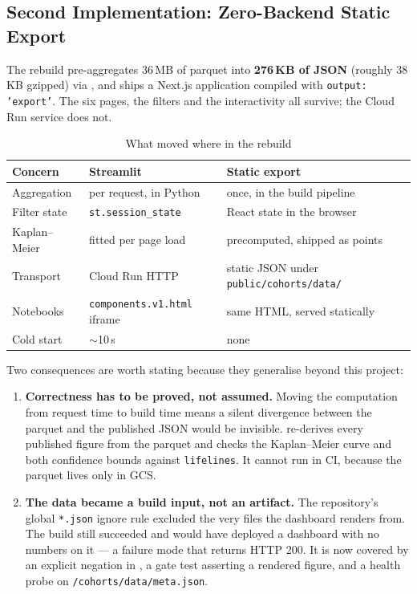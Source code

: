 \subsection{Second Implementation: Zero-Backend Static Export}

The rebuild pre-aggregates 36\,MB of parquet into \textbf{276\,KB of JSON}
(roughly 38\,KB gzipped) via , and
ships a Next.js application compiled with \texttt{output: 'export'}. The six
pages, the filters and the interactivity all survive; the Cloud Run service does
not.

\begin{table}[h]
\centering
\caption{What moved where in the rebuild}
\label{tab:ecom-rebuild}
\begin{tabular}{lll}
\toprule
\textbf{Concern} & \textbf{Streamlit} & \textbf{Static export} \\
\midrule
Aggregation      & per request, in Python & once, in the build pipeline \\
Filter state     & \texttt{st.session\_state} & React state in the browser \\
Kaplan--Meier    & fitted per page load & precomputed, shipped as points \\
Transport        & Cloud Run HTTP & static JSON under \texttt{public/cohorts/data/} \\
Notebooks        & \texttt{components.v1.html} iframe & same HTML, served statically \\
Cold start       & $\sim$10\,s & none \\
\bottomrule
\end{tabular}
\end{table}

Two consequences are worth stating because they generalise beyond this project:

\begin{enumerate}
  \item \textbf{Correctness has to be proved, not assumed.} Moving the
    computation from request time to build time means a silent divergence between
    the parquet and the published JSON would be invisible.
     re-derives every published
    figure from the parquet and checks the Kaplan--Meier curve and both
    confidence bounds against \texttt{lifelines}. It cannot run in CI, because
    the parquet lives only in GCS.
  \item \textbf{The data became a build input, not an artifact.} The repository's
    global \texttt{*.json} ignore rule excluded the very files the dashboard
    renders from. The build still succeeded and would have deployed a dashboard
    with no numbers on it --- a failure mode that returns HTTP 200. It is now
    covered by an explicit negation in , a gate test
    asserting a rendered figure, and a health probe on
    \texttt{/cohorts/data/meta.json}.
\end{enumerate}

